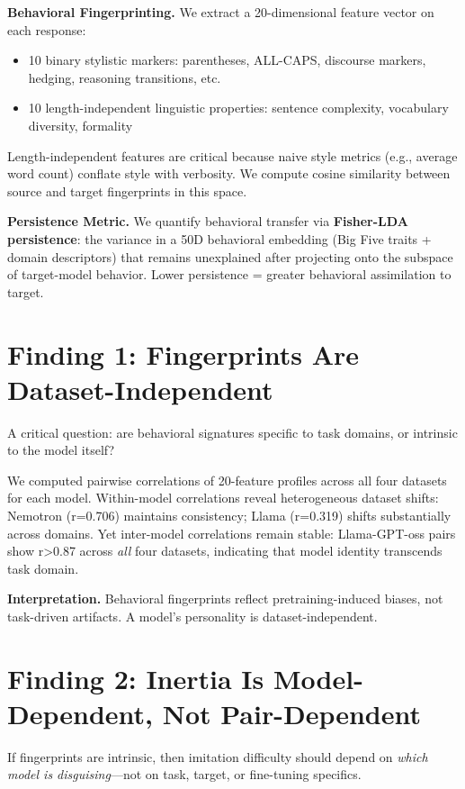 \documentclass[11pt]{article}
\begin{document}
\textbf{Behavioral Fingerprinting.} We extract a 20-dimensional feature vector on each response:
\begin{itemize}
  \item 10 binary stylistic markers: parentheses, ALL-CAPS, discourse markers, hedging, reasoning transitions, etc.
  \item 10 length-independent linguistic properties: sentence complexity, vocabulary diversity, formality
\end{itemize}

Length-independent features are critical because naive style metrics (e.g., average word count) conflate style with verbosity. We compute cosine similarity between source and target fingerprints in this space.

\textbf{Persistence Metric.} We quantify behavioral transfer via \textbf{Fisher-LDA persistence}: the variance in a 50D behavioral embedding (Big Five traits + domain descriptors) that remains unexplained after projecting onto the subspace of target-model behavior. Lower persistence = greater behavioral assimilation to target.

\section{Finding 1: Fingerprints Are Dataset-Independent}

A critical question: are behavioral signatures specific to task domains, or intrinsic to the model itself?

We computed pairwise correlations of 20-feature profiles across all four datasets for each model. Within-model correlations reveal heterogeneous dataset shifts: Nemotron (r=0.706) maintains consistency; Llama (r=0.319) shifts substantially across domains. Yet inter-model correlations remain stable: Llama-GPT-oss pairs show r>0.87 across \textit{all} four datasets, indicating that model identity transcends task domain.

\textbf{Interpretation.} Behavioral fingerprints reflect pretraining-induced biases, not task-driven artifacts. A model's personality is dataset-independent.

\section{Finding 2: Inertia Is Model-Dependent, Not Pair-Dependent}

If fingerprints are intrinsic, then imitation difficulty should depend on \textit{which model is disguising}---not on task, target, or fine-tuning specifics.
\end{document}
